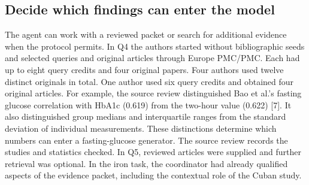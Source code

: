 \documentclass[11pt,letterpaper]{article}
\begin{document}
\subsection{Decide which findings can enter the model}

The agent can work with a reviewed packet or search for additional evidence when the protocol permits. In Q4 the authors started without bibliographic seeds and selected queries and original articles through Europe PMC/\allowbreak{}PMC. Each had up to eight query credits and four original papers. Four authors used twelve distinct originals in total. One author used six query credits and obtained four original articles. For example, the source review distinguished Bao et al.'s fasting glucose correlation with HbA1c (0.619) from the two-hour value (0.622) [7]. It also distinguished group medians and interquartile ranges from the standard deviation of individual measurements. These distinctions determine which numbers can enter a fasting-glucose generator. The source review records the studies and statistics checked. In Q5, reviewed articles were supplied and further retrieval was optional. In the iron task, the coordinator had already qualified aspects of the evidence packet, including the contextual role of the Cuban study.


\begingroup

\small

\renewcommand{\arraystretch}{1.22}
\end{document}
